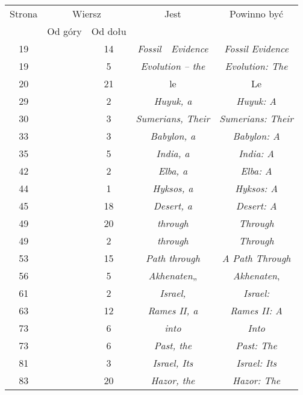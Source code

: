\documentclass[a4paper,11pt]{article}
\begin{document}
\begin{center}

  \begin{tabular}{|c|c|c|c|c|}
    \hline
    Strona & \multicolumn{2}{c|}{Wiersz} & Jest
                              & Powinno być \\ \cline{2-3}
    & Od góry & Od dołu & & \\
    \hline
    19  & & 14 & \textit{Fossil~~Evidence} & \textit{Fossil Evidence} \\
    19  & & \hphantom{0}5 & \textit{Evolution -- the}
    & \textit{Evolution: The} \\
    20  & & 21 & le & Le \\
    29  & & \hphantom{0}2 & \textit{Huyuk, a} & \textit{Huyuk: A} \\
    30  & & \hphantom{0}3 & \textit{Sumerians, Their}
    & \textit{Sumerians: Their} \\
    33  & & \hphantom{0}3 & \textit{Babylon, a} & \textit{Babylon: A} \\
    35  & & \hphantom{0}5 & \textit{India, a} & \textit{India: A} \\
    42  & & \hphantom{0}2 & \textit{Elba, a} & \textit{Elba: A} \\
    44  & & \hphantom{0}1 & \textit{Hyksos, a} & \textit{Hyksos: A} \\
    45  & & 18 & \textit{Desert, a} & \textit{Desert: A} \\
    49  & & 20 & \textit{through} & \textit{Through} \\
    49  & & \hphantom{0}2 & \textit{through} & \textit{Through} \\
    53  & & 15 & \textit{Path through} & \textit{A Path Through} \\
    56  & & \hphantom{0}5 & \textit{Akhenaten}„
           & \textit{Akhenaten}, \\
    61  & & \hphantom{0}2 & \textit{Israel,} & \textit{Israel:} \\
    63  & & 12 & \textit{Rames II, a} & \textit{Rames II: A} \\
    73  & & \hphantom{0}6 & \textit{into} & \textit{Into} \\
    73  & & \hphantom{0}6 & \textit{Past, the} & \textit{Past: The} \\
    81  & & \hphantom{0}3 & \textit{Israel, Its} & \textit{Israel: Its} \\
    83  & & 20 & \textit{Hazor, the} & \textit{Hazor: The} \\

\end{tabular}
\end{center}
\end{document}
